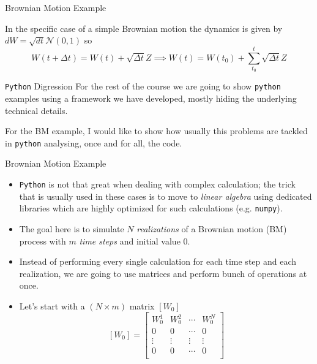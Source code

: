 \documentclass{beamer}
\begin{document}
\begin{frame}[fragile]{Brownian Motion Example}

In the specific case of a simple Brownian motion the dynamics is given by $dW = \sqrt{dt}\mathcal{N}(0,1)$ so
\begin{equation}
W(t+\Delta t) = W(t) + \sqrt{\Delta t}Z \implies
W(t) = W(t_0) + \sum_{t_0}^{t} \sqrt{\Delta t}Z
\label{eq:bm_evolution}
\end{equation}

\begin{block}{\texttt{Python} Digression}
For the rest of the course we are going to show \texttt{python} examples using a framework we have developed, mostly hiding the underlying technical details.

For the BM example, I would like to show how usually this problems are tackled in \texttt{python} analysing, once and for all, the code.
\end{block}
\end{frame}

\begin{frame}{Brownian Motion Example}
\begin{itemize}
    \item \texttt{Python} is not that great when dealing with complex calculation; the trick that is usually used in these cases is to move to \emph{linear algebra} using dedicated libraries which are highly optimized for such calculations (e.g. \texttt{numpy}).
    \item The goal here is to simulate $N$ \emph{realizations} of a Brownian motion (BM) process with $m$ \textit{time steps} and initial value 0. 
    \item Instead of performing every single calculation for each time step and each realization, we are going to use matrices and perform bunch of operations at once.
    \item Let's start with a $(N\times m)$ matrix $[W_0]$
    $$
    [W_0] =
    \begin{bmatrix}
    W^1_0 & W^2_0 & \cdots & W^N_0 \\
    0 & 0 & \cdots & 0 \\
    \vdots & \vdots & \vdots & \vdots \\
    0 & 0 & \cdots & 0 \\
    \end{bmatrix}
    $$
    \end{itemize}
\end{frame}
\end{document}
